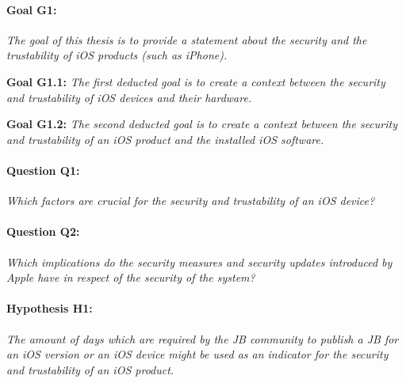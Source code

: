 \paragraph{Goal G1:} \textit{\glqq The goal of this thesis is to provide a statement about the security and the trustability of  iOS products (such as iPhone).\grqq{}} \par
\textbf{Goal G1.1: }\textit{\glqq The first deducted goal is to create a context between the security and trustability of iOS devices and their hardware.\grqq{}} \par
\textbf{Goal G1.2:} \textit{\glqq The second deducted goal is to create a context between the security and trustability of an iOS product and the installed iOS software.\grqq{}}\par

\paragraph{Question Q1:} \textit{\glqq Which factors are crucial for the security and trustability of an iOS device?\grqq{}} \par
\paragraph{Question Q2:} \textit{\glqq Which implications do the security measures and security updates introduced by Apple have in respect of the security of the system?\grqq{}} \par

\paragraph{Hypothesis H1:} \textit{\glqq The amount of days which are required by the JB community to publish a JB for an iOS version or an iOS device might be used as an indicator for the security and trustability of an iOS product. \grqq{}} \par

